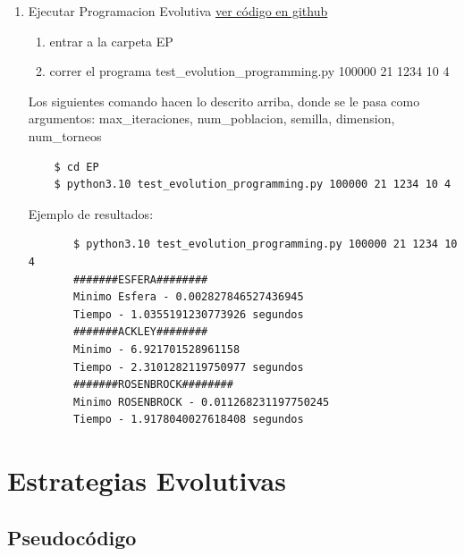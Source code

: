\documentclass{article}
\begin{document}
\begin{enumerate} 
\item Ejecutar Programacion Evolutiva
  \href{https://github.com/luisballado/InteligenciaComputacional/tree/master/code/tarea1/EP}{ver código en github}\\
  \begin{enumerate}
  \item entrar a la carpeta EP
  \item correr el programa test\_evolution\_programming.py 100000 21 1234 10 4
  \end{enumerate} 
  
  Los siguientes comando hacen lo descrito arriba, donde se le pasa como argumentos: max\_iteraciones, num\_poblacion, semilla, dimension, num\_torneos
  
  \begin{commandline}
     \begin{verbatim}
    $ cd EP       
    $ python3.10 test_evolution_programming.py 100000 21 1234 10 4
     \end{verbatim}
  \end{commandline}
  
  Ejemplo de resultados:
  
  \begin{commandline}
     \begin{verbatim}
       $ python3.10 test_evolution_programming.py 100000 21 1234 10 4
       #######ESFERA########
       Minimo Esfera - 0.002827846527436945
       Tiempo - 1.0355191230773926 segundos
       #######ACKLEY########
       Minimo - 6.921701528961158
       Tiempo - 2.3101282119750977 segundos
       #######ROSENBROCK########
       Minimo ROSENBROCK - 0.011268231197750245
       Tiempo - 1.9178040027618408 segundos

     \end{verbatim}
  \end{commandline}
  
\end{enumerate} 


\newpage
\section{Estrategias Evolutivas}
\subsection{Pseudocódigo}
\end{document}
